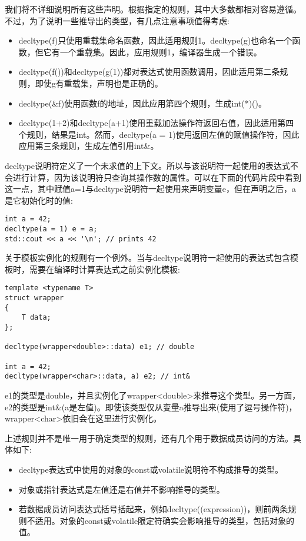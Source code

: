 我们将不详细说明所有这些声明。根据指定的规则，其中大多数都相对容易遵循。不过，为了说明一些推导出的类型，有几点注意事项值得考虑:

\begin{itemize}
\item
decltype(f)只使用重载集命名函数，因此适用规则1。decltype(g)也命名一个函数，但它有一个重载集。因此，应用规则1，编译器生成一个错误。

\item
decltype(f())和decltype(g(1))都对表达式使用函数调用，因此适用第二条规则，即使g有重载集，声明也是正确的。

\item
decltype(\&f)使用函数f的地址，因此应用第四个规则，生成int(*)()。

\item
decltype(1+2)和decltype(a+1)使用重载加法操作符返回右值，因此适用第四个规则，结果是int。然而，decltype(a = 1)使用返回左值的赋值操作符，因此应用第三条规则，生成左值引用int\&。
\end{itemize}

decltype说明符定义了一个未求值的上下文。所以与该说明符一起使用的表达式不会进行计算，因为该说明符只查询其操作数的属性。可以在下面的代码片段中看到这一点，其中赋值a=1与decltype说明符一起使用来声明变量e，但在声明之后，a是它初始化时的值:

\begin{lstlisting}[style=styleCXX]
int a = 42;
decltype(a = 1) e = a;
std::cout << a << '\n'; // prints 42
\end{lstlisting}

关于模板实例化的规则有一个例外。当与decltype说明符一起使用的表达式包含模板时，需要在编译时计算表达式之前实例化模板:

\begin{lstlisting}[style=styleCXX]
template <typename T>
struct wrapper
{
	T data;
};

decltype(wrapper<double>::data) e1; // double

int a = 42;
decltype(wrapper<char>::data, a) e2; // int&
\end{lstlisting}

e1的类型是double，并且实例化了wrapper<double>来推导这个类型。另一方面，e2的类型是int\&(a是左值)。即使该类型仅从变量a推导出来(使用了逗号操作符)，wrapper<char>依旧会在这里进行实例化。

上述规则并不是唯一用于确定类型的规则，还有几个用于数据成员访问的方法。具体如下:

\begin{itemize}
\item
decltype表达式中使用的对象的const或volatile说明符不构成推导的类型。

\item
对象或指针表达式是左值还是右值并不影响推导的类型。

\item
若数据成员访问表达式括号括起来，例如decltype((expression))，则前两条规则不适用。对象的const或volatile限定符确实会影响推导的类型，包括对象的值。
\end{itemize}

